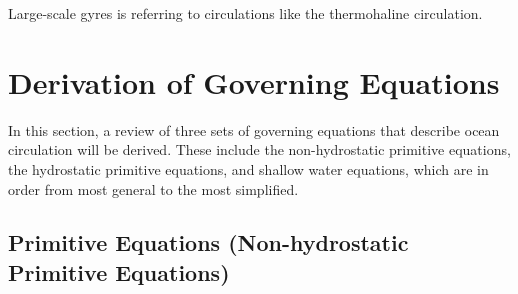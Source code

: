 Large-scale gyres is referring to circulations like the thermohaline circulation.

\section{Derivation of Governing Equations}
\label{derivegoverningeqns}

In this section, a review of three sets of governing equations that describe ocean circulation will be derived.  These include the non-hydrostatic primitive equations, the hydrostatic primitive equations, and shallow water equations, which are in order from most general to the most simplified.  \cite{94CushRoi}

\subsection{Primitive Equations (Non-hydrostatic Primitive Equations)}

